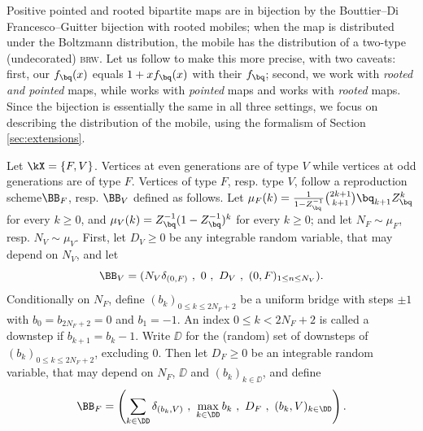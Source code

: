 \documentclass[10pt,a4paper]{article}
\newcommand{\brw}{\textsc{brw}\xspace}
\newcommand{\repscheme}{reproduction scheme\xspace}
\begin{document}
Positive pointed and rooted bipartite maps are in bijection by the Bouttier--Di Francesco--Guitter bijection \cite{bouttier2004planar} with rooted mobiles; when the map is distributed under the Boltzmann distribution, the mobile has the distribution of a two-type (undecorated) \brw. Let us follow \cite[Section 2.3]{marckert2007invariance} to make this more precise, with two caveats: first, our $f_\bq(x)$ equals $1+xf_\bq(x)$ with their $f_\bq$; second, we work with \emph{rooted and pointed} maps, while \cite{bouttier2004planar} works with \emph{pointed} maps and \cite{marckert2007invariance} works with \emph{rooted} maps. Since the bijection is essentially the same in all three settings, we focus on describing the distribution of the mobile, using the formalism of Section \ref{sec:extensions}. 

Let $\kX = \{F,V\}$. Vertices at even generations are of type $V$ while vertices at odd generations are of type $F$. Vertices of type $F$, resp. type $V$, follow a \repscheme $\BB_F$, resp. $\BB_V$ defined as follows. Let 
$\mu_F(k) = \frac{1}{1-Z_\bq^{-1}} {{2k+1} \choose {k+1}} \bq_{k+1} Z_\bq^{k}$ for every $k\geq 0$, and $\mu_V(k) = Z_\bq^{-1} (1-Z_\bq^{-1})^k$ for every $k\geq 0$; and let $N_F \sim \mu_F$, resp. $N_V \sim \mu_V$. 
First, let $D_V\geq 0$ be any integrable random variable, that may depend on $N_V$, and let 
\[ \BB_V = ( N_V \delta_{(0,F)} \ , \ 0 \ , \ D_V \ , \ (0,F)_{1\leq n \leq N_V}) . \]
Conditionally on $N_F$, define $(b_k)_{0\leq k\leq 2N_F+2}$ be a uniform bridge with steps $\pm 1$ with $b_0 = b_{2N_F+2} = 0$ and $b_1 = -1$. An index $0\leq k < 2N_F+2$ is called a downstep if $b_{k+1} = b_k-1$. Write $\DD$ for the (random) set of downsteps of $(b_k)_{0\leq k \leq 2N_F+2}$, excluding $0$. Then let $D_F\geq 0$ be an integrable random variable, that may depend on $N_F$, $\DD$ and $(b_k)_{k\in\DD}$, and define 
\[ \BB_F = \left( \sum_{k\in\DD} \delta_{(b_k,V)} \ , \ \max_{k\in\DD} b_k \ , \ D_F \ , \  (b_k,V)_{k\in\DD} \right) . \]

\end{document}
